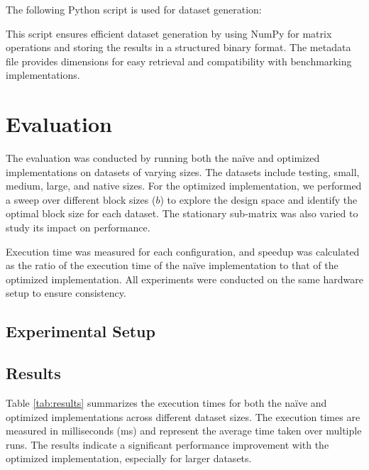 \documentclass[12pt]{article}
\begin{document}
The following Python script is used for dataset generation:


This script ensures efficient dataset generation by using NumPy for matrix operations and storing the results in a structured binary format. The metadata file provides dimensions for easy retrieval and compatibility with benchmarking implementations.

\section{Evaluation}
The evaluation was conducted by running both the naïve and optimized implementations on datasets of varying sizes. The datasets include testing, small, medium, large, and native sizes. For the optimized implementation, we performed a sweep over different block sizes (\( b \)) to explore the design space and identify the optimal block size for each dataset. The stationary sub-matrix was also varied to study its impact on performance.

Execution time was measured for each configuration, and speedup was calculated as the ratio of the execution time of the naïve implementation to that of the optimized implementation. All experiments were conducted on the same hardware setup to ensure consistency.

\subsection{Experimental Setup}


\subsection{Results}
Table \ref{tab:results} summarizes the execution times for both the naïve and optimized implementations across different dataset sizes. The execution times are measured in milliseconds (ms) and represent the average time taken over multiple runs. The results indicate a significant performance improvement with the optimized implementation, especially for larger datasets.
\end{document}
